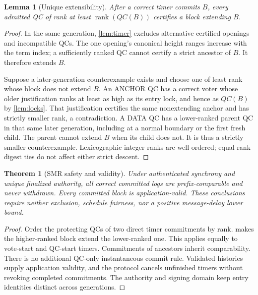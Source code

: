 \documentclass[11pt,a4paper]{article}
\newcommand{\rank}{\operatorname{rank}}
\newtheorem{lemma}[lemma]{Lemma}
\newtheorem{theorem}[theorem]{Theorem}
\newcounter{protocol}
\begin{document}
\begin{lemma}[Unique extensibility]
\label{lem:extend}
After a correct timer commits $B$, every admitted QC of rank at least
$\rank(QC(B))$ certifies a block extending $B$.
\end{lemma}
\begin{proof}
In the same generation, \cref{lem:timer} excludes alternative certified
openings and incompatible QCs. The one opening's canonical height ranges
increase with the term index; a sufficiently ranked QC cannot certify
a strict ancestor of $B$. It therefore extends $B$.

Suppose a later-generation counterexample exists and choose one of
least rank whose block does not extend $B$. An ANCHOR QC has a correct
voter whose older justification ranks at least as high as its entry lock,
and hence as $QC(B)$ by \cref{lem:locks}. That justification certifies the
same nonextending anchor and has strictly smaller rank, a contradiction.
A DATA QC has a lower-ranked parent QC in that same later generation,
including at a normal boundary or the first fresh child. The parent
cannot extend $B$ when its child does not. It is thus a strictly smaller
counterexample. Lexicographic integer ranks are well-ordered; equal-rank
digest ties do not affect either strict descent.
\end{proof}

\begin{theorem}[SMR safety and validity]
\label{thm:safety}
Under authenticated synchrony and unique finalized authority, all correct
committed logs are prefix-comparable and never withdrawn. Every committed
block is application-valid. These conclusions require neither exclusion,
schedule fairness, nor a positive message-delay lower bound.
\end{theorem}
\begin{proof}
Order the protecting QCs of two direct timer commitments by rank.
 makes the higher-ranked block extend the lower-ranked
one. This applies equally to vote-start and QC-start timers. Commitments
of ancestors inherit comparability. There is no additional QC-only
instantaneous commit rule. Validated histories supply application
validity, and the protocol cancels unfinished timers without revoking
completed commitments. The authority and signing domain keep entry
identities distinct across generations.
\end{proof}
\end{document}
